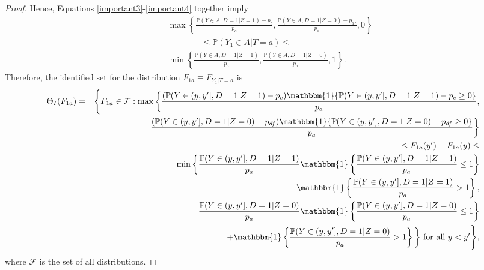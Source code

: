 \documentclass[12pt]{article}
\theoremstyle{plain}
\theoremstyle{definition}
\theoremstyle{remark}
\begin{document}
\begin{proof}
   Hence, Equations \eqref{important3}-\eqref{important4} together imply 
   \begin{eqnarray*}
   && \max\left\{\frac{\mathbb P(Y\in A, D=1 \vert Z=1)- p_{c}}{p_a}, \frac{\mathbb P(Y\in A, D=1 \vert Z=0)- p_{df}}{p_a},0\right\}\\
   && \qquad \qquad \leq \mathbb P(Y_1 \in A \vert T=a) \leq \\
   && \min\left\{\frac{\mathbb P(Y\in A, D=1 \vert Z=1)}{p_a}, \frac{\mathbb P(Y\in A, D=1 \vert Z=0)}{p_a},1\right\}.   
   \end{eqnarray*}
Therefore, the identified set for the distribution $F_{1a}\equiv F_{Y_1\vert T=a}$ is
\begin{eqnarray}
    \Theta_I(F_{1a})&=&\Bigg\{
    F_{1a} \in \mathcal F: \max\bigg\{ \frac{(\mathbb P(Y\in (y,y'], D=1 \vert Z=1)- p_c)\mathbbm{1}\{\mathbb P(Y\in (y,y'], D=1 \vert Z=1)- p_c\geq 0\}}{p_a},\nonumber\\
   && \qquad \frac{(\mathbb P(Y\in (y,y'], D=1 \vert Z=0)- p_{df})\mathbbm{1}\{\mathbb P(Y\in (y,y'], D=1 \vert Z=0)- p_{df}\geq 0\}}{p_a}\bigg\}\nonumber \\
   && \qquad \leq F_{1a}(y')-F_{1a}(y) \leq \\
   && \min\bigg\{ \frac{\mathbb P(Y\in (y,y'], D=1 \vert Z=1)}{p_a}\mathbbm{1}\left\{\frac{\mathbb P(Y\in (y,y'], D=1 \vert Z=1)}{p_a} \leq 1\right\}\nonumber \\
   && \qquad \qquad +\mathbbm{1}\left\{\frac{\mathbb P(Y\in (y,y'], D=1 \vert Z=1)}{p_a} > 1\right\},\nonumber\\
   && \qquad \frac{\mathbb P(Y\in (y,y'], D=1 \vert Z=0)}{p_a}\mathbbm{1}\left\{\frac{\mathbb P(Y\in (y,y'], D=1 \vert Z=0)}{p_a} \leq 1\right\}\nonumber \\
   && \qquad \qquad +\mathbbm{1}\left\{\frac{\mathbb P(Y\in (y,y'], D=1 \vert Z=0)}{p_a} > 1\right\} \bigg\} \text{ for all } y<y'    
   \Bigg\},\nonumber
    \end{eqnarray}
   where $\mathcal F$ is the set of all distributions. 


\end{proof}
\end{document}
